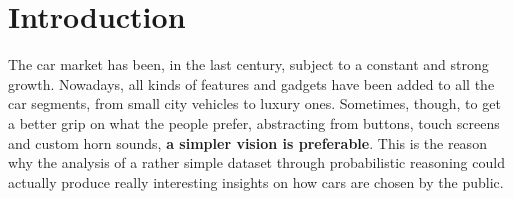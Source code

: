 \section{Introduction}
\label{sec:introduction}

The car market has been, in the last century, subject to a constant and strong growth. Nowadays, all kinds of features and gadgets have been added to all the car segments, from small city vehicles to luxury ones. Sometimes, though, to get a better grip on what the people prefer, abstracting from buttons, touch screens and custom horn sounds, \textbf{a simpler vision is preferable}. This is the reason why the analysis of a rather simple dataset through probabilistic reasoning could actually produce really interesting insights on how cars are chosen by the public.